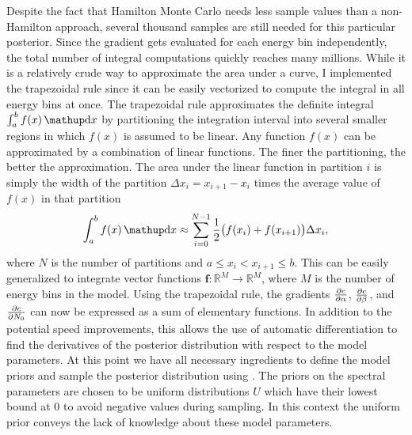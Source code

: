 Despite the fact that Hamilton Monte Carlo needs less sample values than a non-Hamilton approach, several thousand samples are still needed for this particular posterior. 
Since the gradient gets evaluated for each energy bin independently, the total number of integral computations quickly reaches many millions. 
While it is a relatively crude way to approximate the area under a curve, I implemented the trapezoidal rule
since it can be easily vectorized to compute the integral in all energy bins at once.
The trapezoidal rule approximates the definite integral $\int_a^b f(x) \diff{x}$
by partitioning the integration interval into several smaller regions in which $f(x)$ is assumed to be linear. 
Any function $f(x)$ can be approximated by a combination of linear functions. The finer the partitioning, the better the approximation. 
The area under the linear function in partition $i$ is simply the width of the partition $\Delta x_i = x_{i + 1} - x_i$ times the average value of $f(x)$ in that partition
\begin{equation}
  \int_a^b f(x) \diff{x} \approx \sum_{i = 0}^{N - 1} \frac{1}{2} \bigl(f(x_{i}) +  f(x_{i + 1})\bigr) \Delta x_i,
\end{equation}
where $N$ is the number of partitions and $a \leq x_i < x_{i + 1} \leq b$. This can be easily generalized to integrate vector functions $\mathbf{f}: \mathbb{R}^M \rightarrow \mathbb{R}^M$, where $M$
is the number of energy bins in the model.
Using the trapezoidal rule, the gradients $\frac{\partial c}{\partial \alpha}$, $\frac{\partial c}{\partial \beta}$, and $\frac{\partial c}{\partial N_0}$ can now be expressed as a sum
of elementary functions. In addition to the potential speed improvements, this allows the use of automatic differentiation to find the derivatives
of the posterior distribution with respect to the model parameters. 
At this point we have all necessary ingredients to define the model priors and sample the posterior distribution using \pymc. 
The priors on the spectral parameters are chosen to be uniform distributions $U$ which have their lowest 
bound at 0 to avoid negative values during sampling.
In this context the uniform prior conveys the lack of knowledge about these model parameters.
